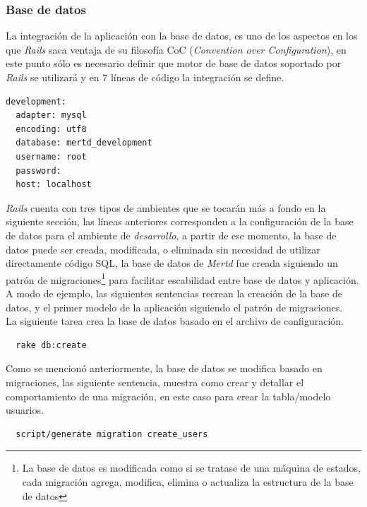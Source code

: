 \subsubsection{Base de datos}

La integración de la aplicación con la base de datos, es uno de los aspectos en los que \emph{Rails} saca ventaja de su filosofía CoC (\emph{Convention over Configuration}), en este punto sólo es necesario definir que motor de base de datos soportado por \emph{Rails} se utilizará y en 7 líneas de código la integración se define.

\begin{verbatim}
development: 
  adapter: mysql 
  encoding: utf8 
  database: mertd_development 
  username: root 
  password: 
  host: localhost	
\end{verbatim}

\emph{Rails} cuenta con tres tipos de ambientes que se tocarán más a fondo en la siguiente sección, las líneas anteriores corresponden a la configuración de la base de datos para el ambiente de \emph{desarrollo}, a partir de ese momento, la base de datos puede ser creada, modificada, o eliminada sin necesidad de utilizar directamente código SQL, la base de datos de \emph{Mertd} fue creada siguiendo un patrón de migraciones\cite{ror:cookbook}\footnote{La base de datos es modificada como si se tratase de una máquina de estados, cada migración agrega, modifica, elimina o actualiza la estructura de la base de datos} para facilitar escabilidad entre base de datos y aplicación.\\

A modo de ejemplo, las siguientes sentencias recrean la creación de la base de datos, y el primer modelo de la aplicación siguiendo el patrón de migraciones.\\

La siguiente tarea crea la base de datos basado en el archivo de configuración.

\begin{verbatim}
  rake db:create 
\end{verbatim}

Como se mencionó anteriormente, la base de datos se modifica basado en migraciones, las siguiente sentencia, muestra como crear y detallar el comportamiento de una migración, en este caso para crear la tabla/modelo usuarios. 

\begin{verbatim}
  script/generate migration create_users
\end{verbatim}

